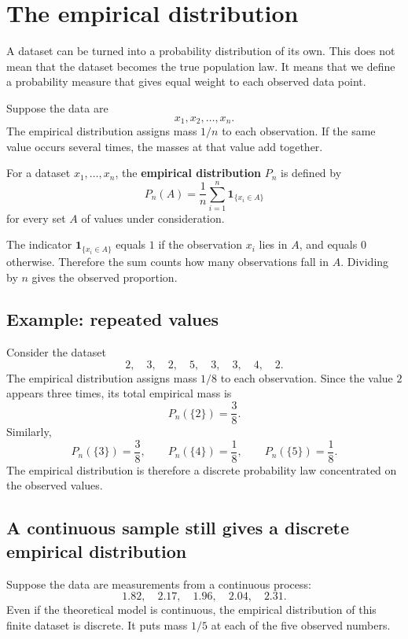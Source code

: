 \section{The empirical distribution}

A dataset can be turned into a probability distribution of its own. This does not
mean that the dataset becomes the true population law. It means that we define a
probability measure that gives equal weight to each observed data point.

Suppose the data are
\[
x_1,x_2,\ldots,x_n.
\]
The empirical distribution assigns mass \(1/n\) to each observation. If the same
value occurs several times, the masses at that value add together.

\begin{definitionbox}
For a dataset \(x_1,\ldots,x_n\), the \textbf{empirical distribution} \(P_n\) is
defined by
\[
P_n(A)=\frac1n\sum_{i=1}^n \mathbf{1}_{\{x_i\in A\}}
\]
for every set \(A\) of values under consideration.
\end{definitionbox}

The indicator \(\mathbf{1}_{\{x_i\in A\}}\) equals \(1\) if the observation \(x_i\)
lies in \(A\), and equals \(0\) otherwise. Therefore the sum counts how many
observations fall in \(A\). Dividing by \(n\) gives the observed proportion.

\subsection*{Example: repeated values}

Consider the dataset
\[
2,\quad 3,\quad 2,\quad 5,\quad 3,\quad 3,\quad 4,\quad 2.
\]
The empirical distribution assigns mass \(1/8\) to each observation. Since the
value \(2\) appears three times, its total empirical mass is
\[
P_n(\{2\})=\frac38.
\]
Similarly,
\[
P_n(\{3\})=\frac38,
\qquad
P_n(\{4\})=\frac18,
\qquad
P_n(\{5\})=\frac18.
\]
The empirical distribution is therefore a discrete probability law concentrated
on the observed values.

\subsection*{A continuous sample still gives a discrete empirical distribution}

Suppose the data are measurements from a continuous process:
\[
1.82,\quad 2.17,\quad 1.96,\quad 2.04,\quad 2.31.
\]
Even if the theoretical model is continuous, the empirical distribution of this
finite dataset is discrete. It puts mass \(1/5\) at each of the five observed
numbers.

